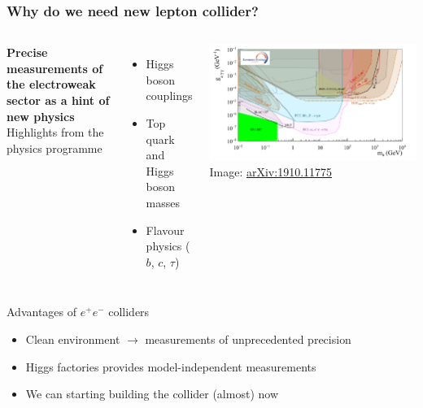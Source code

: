 \documentclass[aspectratio=169]{beamer}
\newcommand{\bluetext}[1]{%
  \textcolor{myBlue}{#1}
}
\begin{document}
\begin{frame}
  \frametitle{Why do we need new lepton collider?}
  
 \vspace{2ex}
 \begin{columns}[c]
  \bluetext{{\bf Precise measurements of the electroweak sector as a hint
  of new physics}} \\[2ex]

  \bluetext{Highlights from the physics programme}
  \begin{itemize}
    \item Higgs boson couplings
    \item Top quark and Higgs boson masses
    \item Flavour physics ($b$, $c$, $\tau$)
  \end{itemize}

    \includegraphics[width=\linewidth]{figures/axions.png} \\
    \tiny{Image: \href{https://arxiv.org/abs/1910.11775}{arXiv:1910.11775}}
  \end{columns}
 \pause%
 
  \vspace{1ex}
  \bluetext{Advantages of $e^+e^-$ colliders}
  \begin{itemize}
    \item Clean environment $\rightarrow$ measurements of unprecedented precision\\
    \item Higgs factories provides model-independent measurements
    \item We can starting building the collider (almost) now
  \end{itemize}
\end{frame}
\end{document}
